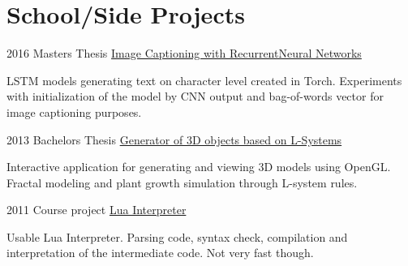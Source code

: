 \documentclass{tccv}
\begin{document}
\section{School/Side Projects}

\begin{eventlist}
	
	\item{2016}
	{Masters Thesis}
	{{\href{https://github.com/kvitajakub/MasterThesis}{Image Captioning with Recurrent\newline Neural Networks}}}
	
	LSTM models generating text on character level created in Torch. Experiments with initialization of the model by CNN output and bag-of-words vector for image captioning purposes. 
	
	\item{2013}
	{Bachelors Thesis}
	{{\href{https://github.com/kvitajakub/LSystemModeller}{Generator of 3D objects based on L-Systems}}}
	
	Interactive application for generating and viewing 3D models using OpenGL. Fractal modeling and plant growth simulation through L-system rules.
	
	\item{2011}
	{Course project}
	{{\href{https://github.com/kvitajakub/interpreterLua}{Lua Interpreter}}}
	
	Usable Lua Interpreter. Parsing code, syntax check, compilation and interpretation of the intermediate code. Not very fast though.
	
\end{eventlist}
\end{document}
